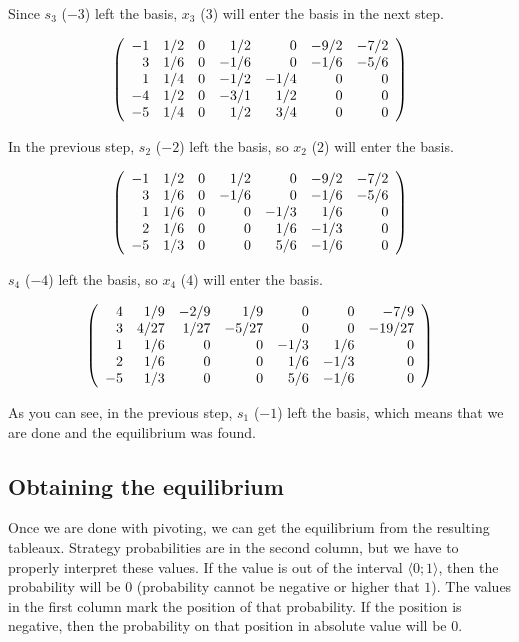 \documentclass[a4paper,10pt]{article}
\begin{document}
Since $s_{3}$ ($-3$) left the basis, $x_{3}$ ($3$) will enter the basis in the
next step.

$$\left(\begin{array}{r r r r r r r}
-1 & 1/2 & 0 & 1/2 & 0 & -9/2 & -7/2 \\
3 & 1/6 & 0 & -1/6 & 0 & -1/6 & -5/6 \\
1 & 1/4 & 0 & -1/2 & -1/4 & 0 & 0 \\
-4 & 1/2 & 0 & -3/1 & 1/2 & 0 & 0 \\
-5 & 1/4 & 0 & 1/2 & 3/4 & 0 & 0 \\
\end{array}\right)$$

In the previous step, $s_{2}$ ($-2$) left the basis, so $x_{2}$ ($2$) will
enter the basis.

$$\left(\begin{array}{r r r r r r r}
-1 & 1/2 & 0 & 1/2 & 0 & -9/2 & -7/2 \\
3 & 1/6 & 0 & -1/6 & 0 & -1/6 & -5/6 \\
1 & 1/6 & 0 & 0 & -1/3 & 1/6 & 0 \\
2 & 1/6 & 0 & 0 & 1/6 & -1/3 & 0 \\
-5 & 1/3 & 0 & 0 & 5/6 & -1/6 & 0
\end{array}\right)$$

$s_{4}$ ($-4$) left the basis, so $x_{4}$ ($4$) will enter the basis.

$$\left(\begin{array}{r r r r r r r}
4 & 1/9 & -2/9 & 1/9 & 0 & 0 & -7/9 \\
3 & 4/27 & 1/27 & -5/27 & 0 & 0 & -19/27 \\
1 & 1/6 & 0 & 0 & -1/3 & 1/6 & 0 \\
2 & 1/6 & 0 & 0 & 1/6 & -1/3 & 0 \\
-5 & 1/3 & 0 & 0 & 5/6 & -1/6 & 0 \\
\end{array}\right)$$

As you can see, in the previous step, $s_{1}$ ($-1$) left the basis, which
means that we are done and the equilibrium was found.

\subsection{Obtaining the equilibrium}

Once we are done with pivoting, we can get the equilibrium from the resulting
tableaux. Strategy probabilities are in the second column, but we have to
properly interpret these values. If the value is out of the interval $\langle
0; 1 \rangle$, then the probability will be $0$ (probability cannot be negative
or higher that $1$). The values in the first column mark the position of that
probability. If the position is negative, then the probability on that position
in absolute value will be $0$.
\end{document}

